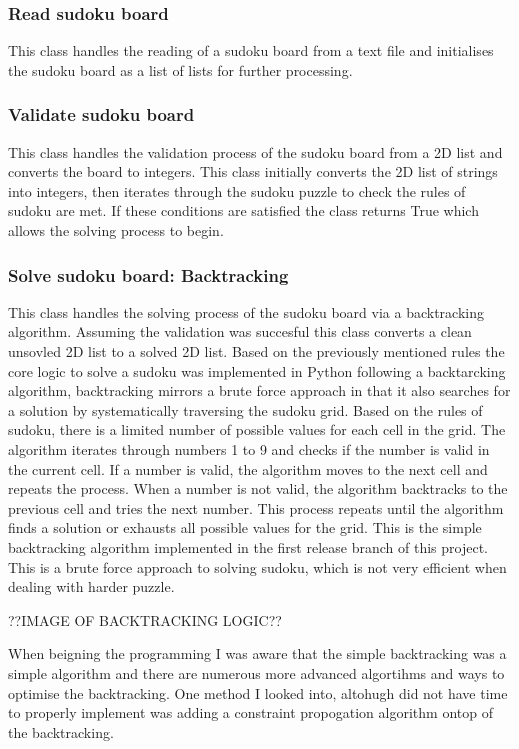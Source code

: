 \documentclass{report}
\begin{document}
\subsubsection*{Read sudoku board}
This class handles the reading of a sudoku board from a text file and initialises the sudoku board as a list of lists for further processing.

\subsubsection*{Validate sudoku board}
This class handles the validation process of the sudoku board from a 2D list and converts the board to integers.
This class initially converts the 2D list of strings into integers, then iterates through the sudoku puzzle
to check the rules of sudoku are met. If these conditions are satisfied the class returns True which allows the solving process to begin.

\subsubsection*{Solve sudoku board: Backtracking}
This class handles the solving process of the sudoku board via a backtracking
algorithm. Assuming the validation was succesful this class converts a clean unsovled 2D list to a solved 2D list.
Based on the previously mentioned rules the core logic to solve a sudoku was implemented in Python following a backtarcking algorithm,
backtracking mirrors a brute force approach in that it also searches for a solution by systematically traversing the sudoku grid.
Based on the rules of sudoku, there is a limited number of possible values for each cell in the grid.
The algorithm iterates through numbers 1 to 9 and checks if the number is valid in the current cell.
If a number is valid, the algorithm moves to the next cell and repeats the process.
When a number is not valid, the algorithm backtracks to the previous cell and tries the next number.
This process repeats until the algorithm finds a solution or exhausts all possible values for the grid.
This is the simple backtracking algorithm implemented in the first release branch of this project.
This is a brute force approach to solving sudoku, which is not very efficient when dealing with harder puzzle.

??IMAGE OF BACKTRACKING LOGIC??


When beigning the programming I was aware that the simple backtracking was a simple algorithm and there are numerous more advanced algortihms and ways to optimise the backtracking. One method I looked into, altohugh did not have time to properly implement was adding a constraint propogation algorithm ontop of the backtracking.
\end{document}
